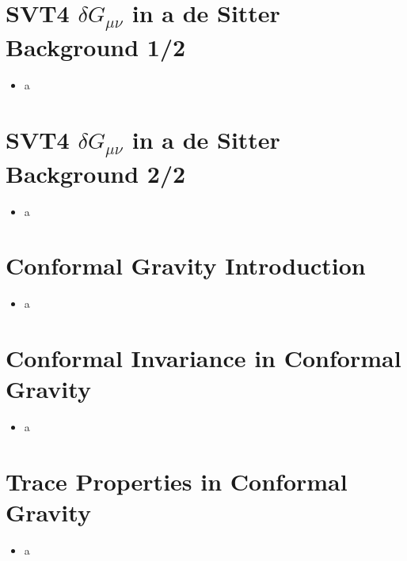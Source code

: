 \documentclass[10pt,letterpaper]{article}
\numberwithin{equation}{section}
\begin{document}
\section{SVT4 $\delta G_{\mu\nu}$ in a de Sitter Background 1/2}
\begin{itemize}
	\item a
\end{itemize}


\section{SVT4 $\delta G_{\mu\nu}$ in a de Sitter Background 2/2}
\begin{itemize}
	\item a
\end{itemize}


\section{Conformal Gravity Introduction}
\begin{itemize}
	\item a
\end{itemize}


\section{Conformal Invariance in Conformal Gravity}
\begin{itemize}
	\item a
\end{itemize}


\section{Trace Properties in Conformal Gravity}
\begin{itemize}
	\item a
\end{itemize}
\end{document}
